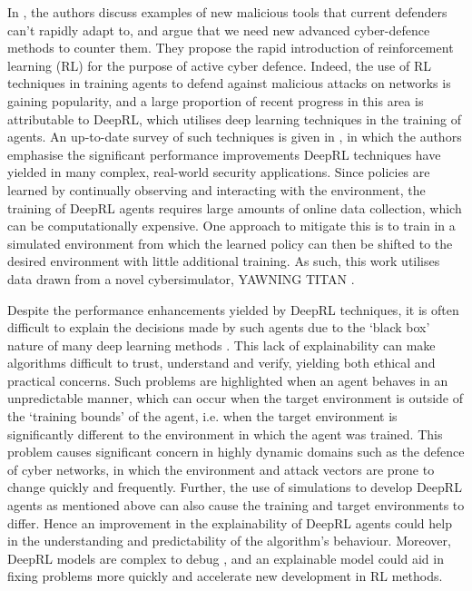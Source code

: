 \documentclass{article}
\begin{document}
In \cite{dhir2021prospective}, the authors discuss examples of new malicious tools that current defenders can’t rapidly adapt to, and argue that we need new advanced cyber-defence methods to counter them. They propose the rapid introduction of reinforcement learning (RL) for the purpose of active cyber defence. Indeed, the use of RL techniques in training agents to defend against malicious attacks on networks is gaining popularity, and a large proportion of recent progress in this area is attributable to  DeepRL, which utilises deep learning techniques in the training of agents. An up-to-date survey of such techniques is given in \cite{sewak2022deep}, in which the authors emphasise the significant performance improvements DeepRL techniques have yielded in many complex, real-world security applications. Since policies are learned by continually observing and interacting with the environment, the training of  DeepRL agents requires large amounts of online data collection, which can be computationally expensive. One approach to mitigate this is to train in a simulated environment from which the learned policy can then be shifted to the desired environment with little additional training. As such, this work utilises data drawn from a novel cybersimulator, YAWNING TITAN \cite{YT}.

Despite the performance enhancements yielded by DeepRL techniques, it is often difficult to explain the decisions made by such agents due to the `black box' nature of many deep learning methods \cite{PearlMackenzie18}. This lack of explainability can make algorithms difficult to trust, understand and verify, yielding both ethical and practical concerns. Such problems are highlighted when an agent behaves in an unpredictable manner, which can occur when the target environment is outside of the `training bounds' of the agent, i.e. when the target environment is significantly different to the environment in which the agent was trained. This problem causes significant concern in highly dynamic domains such as the defence of cyber networks, in which the environment and attack vectors are prone to change quickly and frequently. Further, the use of simulations to develop DeepRL agents as mentioned above can also cause the training and target environments to differ. Hence an improvement in the explainability of DeepRL agents could help in the understanding and predictability of the algorithm's behaviour. Moreover, DeepRL models are complex to debug \cite{heuillet2021explainability}, and an explainable model could aid in fixing problems more quickly and accelerate new development in RL methods. 
\end{document}
